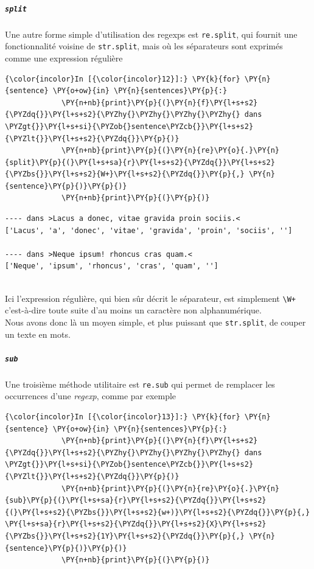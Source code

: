     \hypertarget{split}{%
\subparagraph{\texorpdfstring{\texttt{split}}{split}}\label{split}}

    Une autre forme simple d'utilisation des regexps est \texttt{re.split},
qui fournit une fonctionnalité voisine de \texttt{str.split}, mais où
les séparateurs sont exprimés comme une expression régulière

    \begin{Verbatim}[commandchars=\\\{\}]
{\color{incolor}In [{\color{incolor}12}]:} \PY{k}{for} \PY{n}{sentence} \PY{o+ow}{in} \PY{n}{sentences}\PY{p}{:}
             \PY{n+nb}{print}\PY{p}{(}\PY{n}{f}\PY{l+s+s2}{\PYZdq{}}\PY{l+s+s2}{\PYZhy{}\PYZhy{}\PYZhy{}\PYZhy{} dans \PYZgt{}}\PY{l+s+si}{\PYZob{}sentence\PYZcb{}}\PY{l+s+s2}{\PYZlt{}}\PY{l+s+s2}{\PYZdq{}}\PY{p}{)}
             \PY{n+nb}{print}\PY{p}{(}\PY{n}{re}\PY{o}{.}\PY{n}{split}\PY{p}{(}\PY{l+s+sa}{r}\PY{l+s+s2}{\PYZdq{}}\PY{l+s+s2}{\PYZbs{}}\PY{l+s+s2}{W+}\PY{l+s+s2}{\PYZdq{}}\PY{p}{,} \PY{n}{sentence}\PY{p}{)}\PY{p}{)}
             \PY{n+nb}{print}\PY{p}{(}\PY{p}{)}
\end{Verbatim}


    \begin{Verbatim}[commandchars=\\\{\}]
---- dans >Lacus a donec, vitae gravida proin sociis.<
['Lacus', 'a', 'donec', 'vitae', 'gravida', 'proin', 'sociis', '']

---- dans >Neque ipsum! rhoncus cras quam.<
['Neque', 'ipsum', 'rhoncus', 'cras', 'quam', '']


    \end{Verbatim}

    Ici l'expression régulière, qui bien sûr décrit le séparateur, est
simplement \texttt{\textbackslash{}W+} c'est-à-dire toute suite d'au
moins un caractère non alphanumérique.\\

Nous avons donc là un moyen simple, et plus puissant que
\texttt{str.split}, de couper un texte en mots.

    \hypertarget{sub}{%
\subparagraph{\texorpdfstring{\texttt{sub}}{sub}}\label{sub}}

    Une troisième méthode utilitaire est \texttt{re.sub} qui permet de
remplacer les occurrences d'une \emph{regexp}, comme par exemple

    \begin{Verbatim}[commandchars=\\\{\}]
{\color{incolor}In [{\color{incolor}13}]:} \PY{k}{for} \PY{n}{sentence} \PY{o+ow}{in} \PY{n}{sentences}\PY{p}{:}
             \PY{n+nb}{print}\PY{p}{(}\PY{n}{f}\PY{l+s+s2}{\PYZdq{}}\PY{l+s+s2}{\PYZhy{}\PYZhy{}\PYZhy{}\PYZhy{} dans \PYZgt{}}\PY{l+s+si}{\PYZob{}sentence\PYZcb{}}\PY{l+s+s2}{\PYZlt{}}\PY{l+s+s2}{\PYZdq{}}\PY{p}{)}
             \PY{n+nb}{print}\PY{p}{(}\PY{n}{re}\PY{o}{.}\PY{n}{sub}\PY{p}{(}\PY{l+s+sa}{r}\PY{l+s+s2}{\PYZdq{}}\PY{l+s+s2}{(}\PY{l+s+s2}{\PYZbs{}}\PY{l+s+s2}{w+)}\PY{l+s+s2}{\PYZdq{}}\PY{p}{,} \PY{l+s+sa}{r}\PY{l+s+s2}{\PYZdq{}}\PY{l+s+s2}{X}\PY{l+s+s2}{\PYZbs{}}\PY{l+s+s2}{1Y}\PY{l+s+s2}{\PYZdq{}}\PY{p}{,} \PY{n}{sentence}\PY{p}{)}\PY{p}{)}
             \PY{n+nb}{print}\PY{p}{(}\PY{p}{)}
\end{Verbatim}


